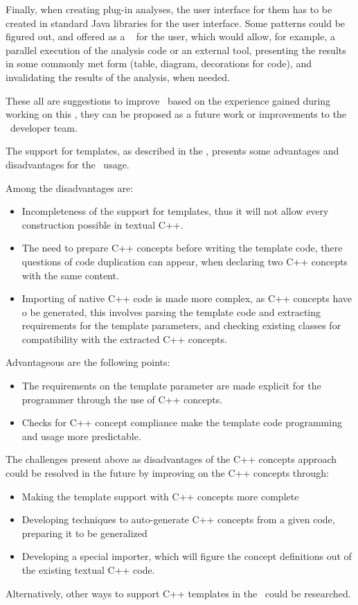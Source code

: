 Finally, when creating plug-in analyses, the user interface for them has to be created in standard Java libraries for the user interface. Some patterns 
could be figured out, and offered as a \jbmps\  for the user, which would allow, for example, a parallel execution of the analysis code or an external tool,
presenting the results in some commonly met form (table, diagram, decorations for code), and invalidating the results of the analysis, when needed.

These all are suggestions to improve \jbmps\ based on the experience gained during working on this \MT, they can be proposed as a future work or improvements 
to the \jbmps\ developer team.




The support for templates, as described in the , presents some advantages and 
disadvantages for the \pcpp\ usage. 

Among the disadvantages are:
\begin{itemize}
 \item Incompleteness of the support for templates, thus it will not allow every construction
 possible in textual C++.
 \item The need to prepare C++ concepts before writing the template code, there questions of 
 code duplication can appear, when declaring two C++ concepts with the same content.
 \item Importing of native C++ code is made more complex, as C++ concepts have o be generated,
 this involves parsing the template code and extracting requirements for the template parameters,
 and checking existing classes for compatibility with the extracted C++ concepts.
\end{itemize}


Advantageous are the following points:
\begin{itemize}
 \item The requirements on the template parameter are made explicit for the programmer through the 
 use of C++ concepts.
 \item Checks for C++ concept compliance make the template code programming and usage more
 predictable.
\end{itemize}

The challenges present above as disadvantages of the C++ concepts approach could be resolved
in the future by improving on the C++ concepts through:
\begin{itemize}
 \item Making the template support with C++ concepts more complete
 \item Developing techniques to auto-generate C++ concepts from a given code, 
 preparing it to be generalized
 \item Developing a special importer, which will figure the concept definitions out of
 the existing textual C++ code.
\end{itemize}

Alternatively, other ways to support C++ templates in the \pcpp\ could be researched.